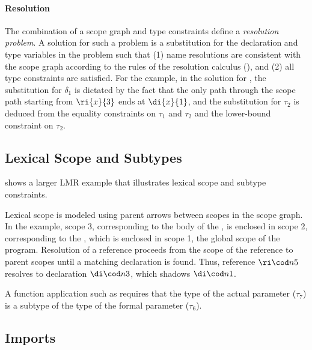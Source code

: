 \paragraph{Resolution}

The combination of a scope graph and type constraints define a \emph{resolution
problem}.
A solution for such a problem is a substitution for the declaration and type
variables in the problem such that (1) name resolutions are consistent with the
scope graph according to the rules of the resolution calculus
(), and (2) all type constraints are satisfied. For the
example, in the solution for , the substitution for $\delta_1$
is dictated by the fact that the only path through the scope path starting from
$\ri{x}{3}$ ends at $\di{x}{1}$, and the substitution for $\tau_2$ is deduced
from the equality constraints on $\tau_1$ and  $\tau_2$ and the 
lower-bound constraint on $\tau_2$. 

\subsection{Lexical Scope and Subtypes}

\begin{figure}[t]
  
\end{figure}

 shows a larger LMR example that illustrates lexical scope
and subtype constraints.

Lexical scope is modeled using parent arrows between scopes in the scope graph.
In the example, scope 3, corresponding to the body of the , is enclosed
in scope 2, corresponding to the , which is enclosed in scope 1, the
global scope of the program.
Resolution of a reference proceeds from the scope of the reference to parent
scopes until a matching declaration is found. 
Thus, reference $\ric{n}{5}$ resolves to declaration $\dic{n}{3}$, which shadows
$\dic{n}{1}$.

A function application such as  requires that the type
of the actual parameter ($\tau_7$) is a subtype of the type of the
formal parameter ($\tau_6$).

\subsection{Imports}

\begin{figure}[t]
  
\end{figure}


